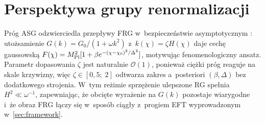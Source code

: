 \documentclass[11pt,a4paper]{article}
\begin{document}
\section{Perspektywa grupy renormalizacji}
\label{sec:rg}
Próg ASG odzwierciedla przepływy FRG w~bezpieczeństwie asymptotycznym \cite{Saueressig2023}: utożsamienie $G(k)=G_{0}/(1+\omega k^{2})$ z~$k(\chi)=\zeta H(\chi)$ daje cechę gaussowską $F(\chi)=M_{\rm Pl}^{2}[1+\beta e^{-(\chi-\chi_{0})^{2}/\Delta^{2}}]$, motywując fenomenologiczny ansatz. Parametr dopasowania $\zeta$ jest naturalnie $\mathcal{O}(1)$, ponieważ ciężki próg reaguje na skale krzywizny, więc $\zeta\in[0{,}5;\;2]$ odtwarza zakres a~posteriori $(\beta,\Delta)$ bez dodatkowego strojenia. W~tym reżimie sprzężenie ulepszone RG spełnia $H^{2}\ll \omega^{-1}$, zapewniając, że obcięte wyrażenie na $G(k)$ pozostaje wiarygodne i~że obraz FRG łączy się w~sposób ciągły z~progiem EFT wyprowadzonym w~\cref{sec:framework}.
\end{document}
